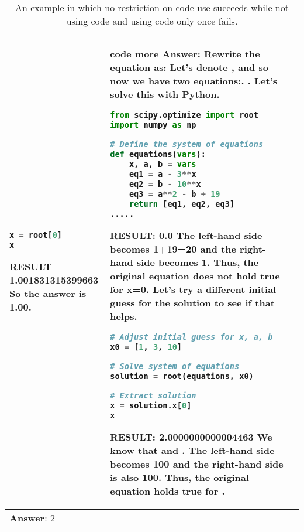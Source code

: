 \documentclass{article} \usepackage{iclr2023_conference,times}
\begin{document}
\begin{table*}[ht]
\begin{tabular}{p{}|p{}|p{}}
\begin{lstlisting}[language=Python]
x = root[0]
x
     \end{lstlisting} 
     \textbf{RESULT}\newline
     \textbf{1.001831315399663}\newline
     So the answer is 1.00.
     &
     \small \textbf{code more} \newline
     \newline
     \small Answer: \newline
     \small 
    Rewrite the equation as:\newline
    \newline
    Let's denote , and \newline
    so \newline
    now we have two equations:\newline
    1. \newline
    2. 
    Let's solve this with Python.
    \lstset{style=mystyle}
     \begin{lstlisting}[language=Python]
from scipy.optimize import root
import numpy as np

# Define the system of equations
def equations(vars):
    x, a, b = vars
    eq1 = a - 3**x
    eq2 = b - 10**x
    eq3 = a**2 - b + 19
    return [eq1, eq2, eq3]
.....
     \end{lstlisting} 
    \textbf{RESULT:}\newline
    \textbf{0.0}\newline
    \newline
The left-hand side becomes 1+19=20 and the right-hand side becomes 1. Thus, the original equation does not hold true for x=0.\newline
     Let's try a different initial guess for the solution to see if that helps.
         \lstset{style=mystyle}
     \begin{lstlisting}[language=Python]
# Adjust initial guess for x, a, b
x0 = [1, 3, 10]

# Solve system of equations
solution = root(equations, x0)

# Extract solution
x = solution.x[0]
x
     \end{lstlisting} 
         \textbf{RESULT:}\newline
    \textbf{2.0000000000004463}\newline
    We know that  and . The left-hand side becomes 100 and the right-hand side is also 100. Thus, the original equation holds true for . 
     \\
     \midrule

      \multicolumn{3}{p{0.90\textwidth}}{\small \textbf{Answer}: 2}
\\
     \bottomrule
    \end{tabular}
    \caption{An example in which no restriction on code use succeeds while not using code and using code only once fails.}
    \label{tab:code_freq_example1}
\end{table*}
\end{document}
